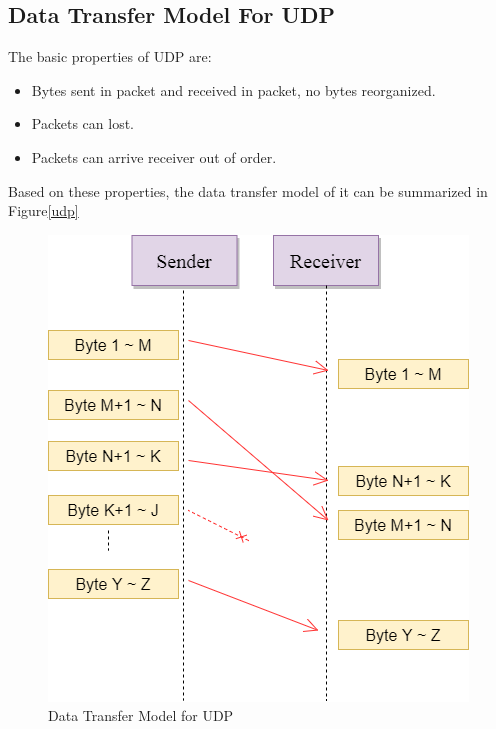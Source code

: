 \subsection{Data Transfer Model For UDP}
The basic properties of UDP are:
\begin{itemize}
  \item Bytes sent in packet and received in packet, no bytes reorganized.
  \item Packets can lost.
  \item Packets can arrive receiver out of order.
\end{itemize}
Based on these properties, the data transfer model of it can be summarized in Figure\ref{udp}
\begin{figure}[h]
\centerline{\includegraphics[scale=0.6]{Figures/udp}}
 \caption{Data Transfer Model for UDP}
\label{tcp}
\end{figure}
